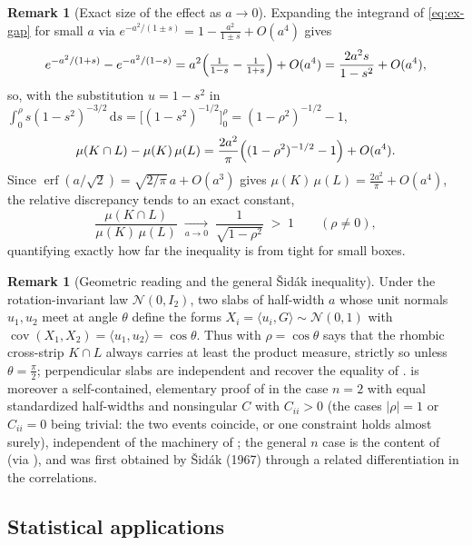 \documentclass[12pt,a4paper]{article}
\theoremstyle{definition}
\newtheorem{remark}[theorem]{Remark}
\newcommand{\Cov}{\operatorname{cov}}
\newcommand{\dd}{\mathrm{d}}
\newcommand{\caln}{\mathcal{N}}
\newcommand{\erf}{\operatorname{erf}}
\begin{document}
\begin{remark}[Exact size of the effect as $a\to 0$]\label{rem:ex-smalla}
  Expanding the integrand of \eqref{eq:ex-gap} for small $a$ via
  $e^{-a^2/(1\pm s)}=1-\tfrac{a^2}{1\pm s}+O(a^4)$ gives
  \[
    e^{-a^2/(1+s)}-e^{-a^2/(1-s)}
    =a^2\Bigl(\tfrac{1}{1-s}-\tfrac{1}{1+s}\Bigr)+O(a^4)
    =\frac{2a^2 s}{1-s^2}+O(a^4),
  \]
  so, with the substitution $u=1-s^2$ in
  $\int_0^{\rho}s(1-s^2)^{-3/2}\,\dd s=\bigl[(1-s^2)^{-1/2}\bigr]_0^{\rho}
  =(1-\rho^2)^{-1/2}-1$,
  \[
    \mu(K\cap L)-\mu(K)\,\mu(L)
    =\frac{2a^2}{\pi}\Bigl((1-\rho^2)^{-1/2}-1\Bigr)+O(a^4).
  \]
  Since $\erf(a/\sqrt2)=\sqrt{2/\pi}\,a+O(a^3)$ gives
  $\mu(K)\,\mu(L)=\tfrac{2a^2}{\pi}+O(a^4)$, the relative discrepancy
  tends to an exact constant,
  \[
    \frac{\mu(K\cap L)}{\mu(K)\,\mu(L)}
    \;\xrightarrow[a\to0]{}\;\frac{1}{\sqrt{1-\rho^2}}\;>\;1
    \qquad(\rho\neq0),
  \]
  quantifying exactly how far the inequality is from tight for small
  boxes.
\end{remark}

\begin{remark}[Geometric reading and the general \v{S}id\'ak inequality]
  \label{rem:ex-geom}
  Under the rotation-invariant law $\caln(0,I_2)$, two slabs of
  half-width $a$ whose unit normals $u_1,u_2$ meet at angle $\theta$
  define the forms $X_i=\langle u_i,G\rangle\sim\caln(0,1)$ with
  $\Cov(X_1,X_2)=\langle u_1,u_2\rangle=\cos\theta$.  Thus 
  with $\rho=\cos\theta$ says that the rhombic cross-strip $K\cap L$
  always carries at least the product measure, strictly so unless
  $\theta=\tfrac\pi2$; perpendicular slabs are independent and recover
  the equality of .   is moreover a
  self-contained, elementary proof of  in the case
  $n=2$ with equal standardized half-widths and nonsingular $C$ with
  $C_{ii}>0$ (the cases $|\rho|=1$ or $C_{ii}=0$ being trivial: the two
  events coincide, or one constraint holds almost surely), independent of the machinery of ; the general
  $n$ case is the content of  (via ), and
  was first obtained by \v{S}id\'ak (1967) through a related
  differentiation in the correlations.
\end{remark}



\subsection{Statistical applications}\label{sub:ex-stats}
\end{document}
